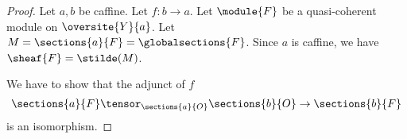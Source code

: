 \begin{proof}
Let $a,b$ be caffine. Let $f:b \rightarrow a$.
Let $\module{F}$ be a quasi-coherent module on $\oversite{Y}{a}$.
Let $M = \sections{a}{F} = \globalsections{F}$.
Since $a$ is caffine, we have $\sheaf{F} = \stilde(M)$.

We have to show that the adjunct of $f$
\[\sections{a}{F} \tensor_{\sections{a}{O}} \sections{b}{O} \rightarrow \sections{b}{F}\]
is an isomorphism.














\end{proof}





